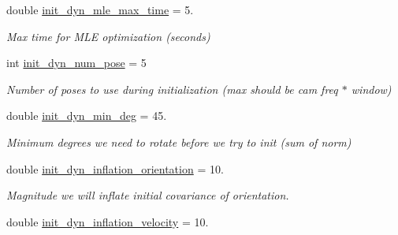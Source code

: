 \begin{DoxyCompactItemize}
double \hyperlink{structov__init_1_1InertialInitializerOptions_ade879e2b38eb03ebe50bbd4cbd5a1ba6}{init\+\_\+dyn\+\_\+mle\+\_\+max\+\_\+time} = 5.
\begin{DoxyCompactList}\small\item\em Max time for M\+LE optimization (seconds) \end{DoxyCompactList}\item 
\mbox{\label{structov__init_1_1InertialInitializerOptions_a77d404c5b0dd4a9957f7e857e759f538}} 
int \hyperlink{structov__init_1_1InertialInitializerOptions_a77d404c5b0dd4a9957f7e857e759f538}{init\+\_\+dyn\+\_\+num\+\_\+pose} = 5
\begin{DoxyCompactList}\small\item\em Number of poses to use during initialization (max should be cam freq $\ast$ window) \end{DoxyCompactList}\item 
\mbox{\label{structov__init_1_1InertialInitializerOptions_a3f6fb9d845f5fb69bb5e38ba1776d98a}} 
double \hyperlink{structov__init_1_1InertialInitializerOptions_a3f6fb9d845f5fb69bb5e38ba1776d98a}{init\+\_\+dyn\+\_\+min\+\_\+deg} = 45.
\begin{DoxyCompactList}\small\item\em Minimum degrees we need to rotate before we try to init (sum of norm) \end{DoxyCompactList}\item 
\mbox{\label{structov__init_1_1InertialInitializerOptions_ac18caae89ce58c128ddb0c9afdcb65fd}} 
double \hyperlink{structov__init_1_1InertialInitializerOptions_ac18caae89ce58c128ddb0c9afdcb65fd}{init\+\_\+dyn\+\_\+inflation\+\_\+orientation} = 10.
\begin{DoxyCompactList}\small\item\em Magnitude we will inflate initial covariance of orientation. \end{DoxyCompactList}\item 
\mbox{\label{structov__init_1_1InertialInitializerOptions_aafab6a5eca4819a84137bd93452ba30a}} 
double \hyperlink{structov__init_1_1InertialInitializerOptions_aafab6a5eca4819a84137bd93452ba30a}{init\+\_\+dyn\+\_\+inflation\+\_\+velocity} = 10.

\end{DoxyCompactItemize}
